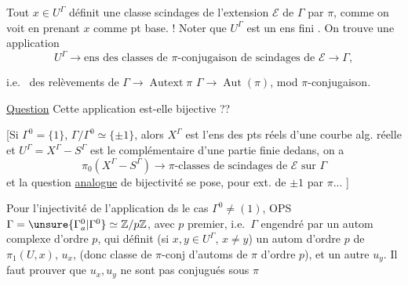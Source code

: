  Tout $x\in U^\Gamma$ définit une classe   scindages de l'extension $\mathcal E$ de $\Gamma$ par $\pi$, comme on voit en prenant $x$ comme pt base. ! Noter que $U^\Gamma$ est un ens fini \inserted{si $\Gamma^0\ne1$, [i.e.\ $\Gamma$ pas réduit à une \deleted{\illegible{1}} \unsure{anti-involution} \illegible{1})}.
On trouve  une application
\[
U^\Gamma\longrightarrow\text{ens des classes de }\pi\text{-conjugaison de scindages de }\mathcal E\longrightarrow\Gamma,
\]


i.e.\  des relèvements de $\Gamma\longrightarrow\operatorname{Autext}\pi$  $\Gamma\longrightarrow\operatorname{Aut}(\pi)$, mod $\pi$-conjugaison.

\uline{Question}  Cette application est-elle bijective ??

[Si $\Gamma^0=\{1\}$, $\Gamma/\Gamma^0\simeq\{\pm1\}$, alors $X^\Gamma$ est l'ens des pts réels d'une courbe alg. réelle et $U^\Gamma=X^\Gamma-S^\Gamma$ est le complémentaire d'une partie finie dedans, on a
\[
\pi_0(X^\Gamma-S^\Gamma)\longrightarrow
\pi\text{-classes de scindages de }\mathcal E\text{ sur }\Gamma
\]
et la  question \uline{analogue} de bijectivité se pose, pour ext. de $\pm1$ par $\pi$... ]

Pour l'injectivité de l'application ds le cas $\Gamma^0\ne(1)$, OPS $\Gamma=\unsure{\Gamma^0_a|\Gamma^0}\simeq\mathbb Z/p\mathbb Z$, avec $p$ premier, i.e.\ $\Gamma$ engendré par un autom complexe  d'ordre $p$, qui définit (si $x,y\in U^\Gamma$, $x\ne y$) un autom d'ordre $p$ de $\pi_1(U,x)$,  $u_x$,   (donc classe de $\pi$-conj d'automs de $\pi$ d'ordre $p$), et un autre $u_y$.
Il faut prouver que $u_x,u_y$ ne sont pas conjugués sous $\pi$


